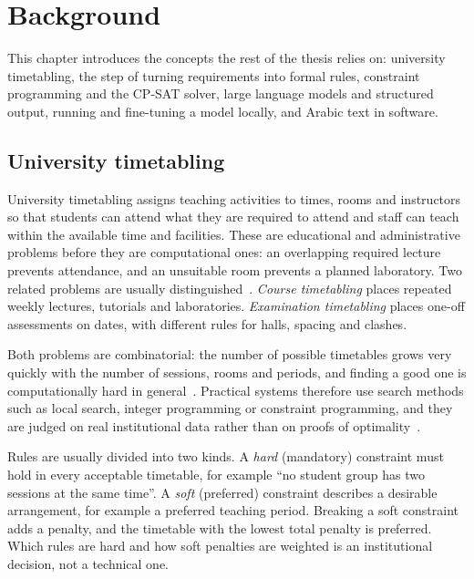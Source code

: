 \chapter{Background}\label{chap:background}


This chapter introduces the concepts the rest of the thesis relies on: university timetabling, the step of turning requirements into formal rules, constraint programming and the CP-SAT solver, large language models and structured output, running and fine-tuning a model locally, and Arabic text in software.

\section{University timetabling}\label{university-timetabling}

University timetabling assigns teaching activities to times, rooms and instructors so that students can attend what they are required to attend and staff can teach within the available time and facilities. These are educational and administrative problems before they are computational ones: an overlapping required lecture prevents attendance, and an unsuitable room prevents a planned laboratory. Two related problems are usually distinguished~\cite{schaerf1999survey,petrovic2004university}. \emph{Course timetabling} places repeated weekly lectures, tutorials and laboratories. \emph{Examination timetabling} places one-off assessments on dates, with different rules for halls, spacing and clashes.

Both problems are combinatorial: the number of possible timetables grows very quickly with the number of sessions, rooms and periods, and finding a good one is computationally hard in general~\cite{schaerf1999survey}. Practical systems therefore use search methods such as local search, integer programming or constraint programming, and they are judged on real institutional data rather than on proofs of optimality~\cite{muller2025itc}.

Rules are usually divided into two kinds. A \emph{hard} (mandatory) constraint must hold in every acceptable timetable, for example ``no student group has two sessions at the same time''. A \emph{soft} (preferred) constraint describes a desirable arrangement, for example a preferred teaching period. Breaking a soft constraint adds a penalty, and the timetable with the lowest total penalty is preferred. Which rules are hard and how soft penalties are weighted is an institutional decision, not a technical one.

